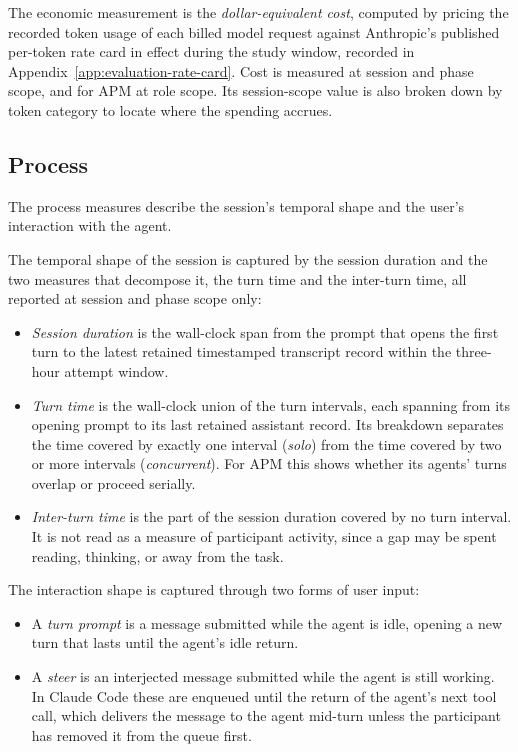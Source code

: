 The economic measurement is the \emph{dollar-equivalent cost}, computed by pricing the recorded token usage of each billed model request against Anthropic's published per-token rate card in effect during the study window, recorded in Appendix~\ref{app:evaluation-rate-card}. Cost is measured at session and phase scope, and for APM at role scope. Its session-scope value is also broken down by token category to locate where the spending accrues.

\subsection{Process}
\label{sec:evaluation-metrics-process}

The process measures describe the session's temporal shape and the user's interaction with the agent.

The temporal shape of the session is captured by the session duration and the two measures that decompose it, the turn time and the inter-turn time, all reported at session and phase scope only:
\begin{itemize}
    \item \emph{Session duration} is the wall-clock span from the prompt that opens the first turn to the latest retained timestamped transcript record within the three-hour attempt window.
    \item \emph{Turn time} is the wall-clock union of the turn intervals, each spanning from its opening prompt to its last retained assistant record. Its breakdown separates the time covered by exactly one interval (\emph{solo}) from the time covered by two or more intervals (\emph{concurrent}). For APM this shows whether its agents' turns overlap or proceed serially.
    \item \emph{Inter-turn time} is the part of the session duration covered by no turn interval. It is not read as a measure of participant activity, since a gap may be spent reading, thinking, or away from the task.
\end{itemize}

The interaction shape is captured through two forms of user input:
\begin{itemize}
    \item A \emph{turn prompt} is a message submitted while the agent is idle, opening a new turn that lasts until the agent's idle return.
    \item A \emph{steer} is an interjected message submitted while the agent is still working. In Claude Code these are enqueued until the return of the agent's next tool call, which delivers the message to the agent mid-turn unless the participant has removed it from the queue first.
\end{itemize}

